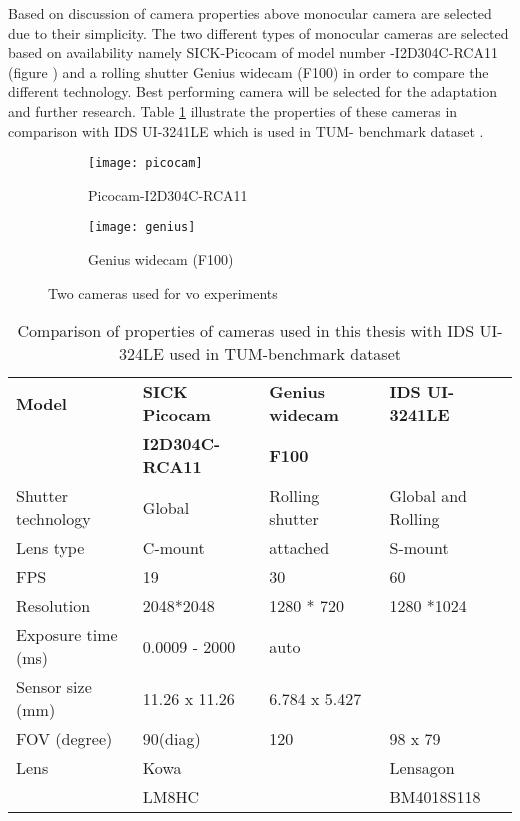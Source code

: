 \newline
Based on discussion of camera properties above monocular camera are selected due to their simplicity. The two different types of monocular cameras are selected based on availability namely SICK-Picocam of model number -I2D304C-RCA11 (figure ) and a rolling shutter Genius widecam (F100) in order to compare the different technology. Best performing camera will be selected for the adaptation and further research. Table \ref{table:camera_prop} illustrate the properties of these cameras in comparison with IDS UI-3241LE which is used in TUM- benchmark dataset \cite{photometrically}.
\begin{figure}[h!]
	\begin{subfigure}{.5\textwidth}
		\centering
		\texttt{[image: picocam]}
		\caption{Picocam-I2D304C-RCA11 \cite{picocam}}
		\label{fig:picocam}
	\end{subfigure}%
	\begin{subfigure}{.5\textwidth}
		\centering
		\texttt{[image: genius]}
		\caption{ Genius widecam (F100) \cite{genius}}
		\label{fig:webcam}
	\end{subfigure}
	\caption{Two cameras used for \acrshort{vo} experiments}
	\label{fig:cameras_used}
\end{figure}

\begin{table}[h!]
	\centering
	\begin{tabular}{ | l | l | l | l |}
		\hline
		\textbf{Model} & \textbf{SICK Picocam}  & \textbf{Genius widecam}  & \textbf{IDS UI-3241LE}  \\  
		              & \textbf{I2D304C-RCA11} & \textbf{F100} &  \\  
		\hline
		Shutter technology & Global & Rolling shutter & Global and Rolling \\ 
		\hline
		Lens type         & C-mount & attached        & S-mount \\ 
		\hline
		FPS               & 19      & 30              & 60\\ 
		\hline
		Resolution       & 2048*2048  &  1280 * 720   & 1280 *1024 \\
		 \hline
		Exposure time (ms) & 0.0009 - 2000 & auto &    \\
		 \hline
		Sensor size (mm) & 11.26 x 11.26 & 6.784 x 5.427 &  \\
		 \hline
		FOV (degree) &  90(diag) &  120 & 98 x 79  \\
		 \hline
		Lens &  Kowa   &   & Lensagon \\
		     &  LM8HC  &   & BM4018S118  \\
		 \hline
	\end{tabular}
    \caption{Comparison of properties of cameras used in this thesis with IDS UI-324LE used in TUM-benchmark dataset}
    \label{table:camera_prop}
\end{table}

